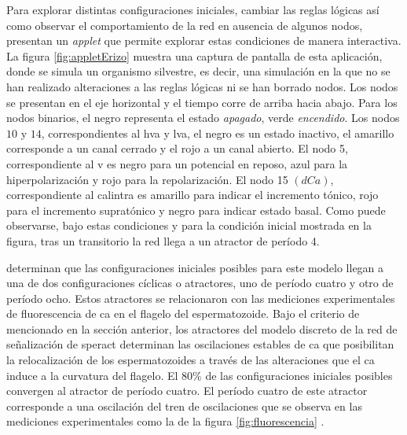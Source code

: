 Para explorar distintas configuraciones iniciales, cambiar las reglas lógicas así como observar el comportamiento de la red en ausencia de algunos nodos, \citeauthor{Espinal2011} \citep{Espinal2011} presentan un \emph{applet} que permite explorar estas condiciones de manera interactiva. La figura \ref{fig:appletErizo} muestra una captura de pantalla de esta aplicación, donde se simula un organismo silvestre, es decir, una simulación en la que no se han realizado alteraciones a las reglas lógicas ni se han borrado nodos. Los nodos se presentan en el eje horizontal y el tiempo corre de arriba hacia abajo. Para los nodos binarios, el negro representa el estado \emph{apagado}, verde \emph{encendido}. Los nodos $10$ y $14$, correspondientes al \ac{hva} y \ac{lva}, el negro es un estado inactivo, el amarillo corresponde a un canal cerrado y el rojo a un canal abierto. El nodo 5, correspondiente al \acf{v} es negro para un potencial en reposo, azul para la hiperpolarización y rojo para la repolarización. El nodo 15 $(dCa)$, correspondiente al \ac{calintra} es amarillo para indicar el incremento tónico, rojo para el incremento supratónico y negro para indicar estado basal. Como puede observarse, bajo estas condiciones y para la condición inicial mostrada en la figura, tras un transitorio la red llega a un atractor de período 4.

\citeauthor{Espinal2011} \citep{Espinal2011} determinan que las configuraciones iniciales posibles para este modelo llegan a una de dos configuraciones cíclicas o atractores, uno de período cuatro y otro de período ocho. Estos atractores se relacionaron con las mediciones experimentales de fluorescencia de \ac{ca} en el flagelo del espermatozoide. Bajo el criterio de \citeauthor{huang2005} \citep{huang2005} mencionado en la sección anterior, los atractores del modelo discreto de la red de señalización de speract determinan las oscilaciones estables de \ac{ca} que posibilitan la relocalizaci\'on de los espermatozoides a trav\'es de las alteraciones que el \ac{ca} induce a la curvatura del flagelo. El 80\% de las configuraciones iniciales posibles convergen al atractor de período cuatro. El período cuatro de este atractor corresponde a una oscilación del tren de oscilaciones que se observa en las mediciones experimentales como la de la figura \ref{fig:fluorescencia} \citeauthor{Espinal2011} \citep{Espinal2011}.

